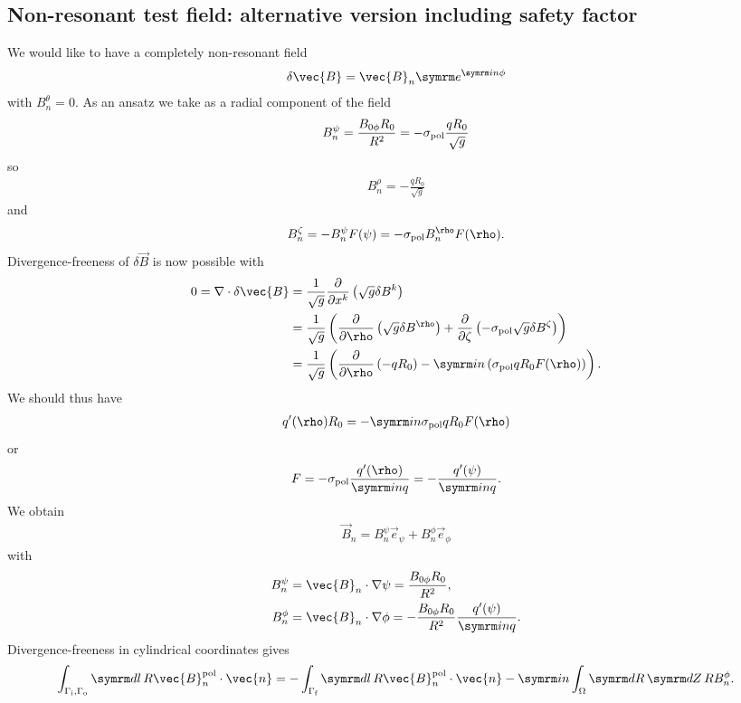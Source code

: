 \subsection{Non-resonant test field: alternative version including safety factor}

We would like to have a completely non-resonant field
\begin{gather*}
  \delta \vec{B} = \vec{B}_{n} \e^{\im n \phi}
\end{gather*}
with $B_{n}^{\theta} = 0$. As an ansatz we take as a radial component of the field
\begin{gather}
  B_{n}^{\psi} = \frac{B_{0 \phi} R_{0}}{R^{2}} = -\sigma_{\pol} \frac{q R_{0}}{\sqrt{g}}
\end{gather}
so
\begin{gather*}
  B_{n}^{\rho} = -\frac{q R_{0}}{\sqrt{g}}
\end{gather*}
and
\begin{gather*}
  B_{n}^{\zeta} = -B_{n}^{\psi} F(\psi) = -\sigma_{\pol} B_{n}^{\rho} F(\rho).
\end{gather*}
Divergence-freeness of $\delta \vec{B}$ is now possible with
\begin{align*}
  0 = \nabla \cdot \delta \vec{B} &= \frac{1}{\sqrt{g}} \pd{x^{k}} \left( \sqrt{g} \delta B^{k} \right) \\
  &= \frac{1}{\sqrt{g}} \left( \pd{\rho} \left( \sqrt{g} \delta B^{\rho} \right) + \pd{\zeta} \left( -\sigma_{\pol} \sqrt{g} \delta B^{\zeta} \right) \right) \\
  &= \frac{1}{\sqrt{g}} \left(\pd{\rho} \left( -q R_{0} \right) - \im n \left( \sigma_{\pol} q R_{0} F(\rho) \right) \right).
\end{align*}
We should thus have 
\begin{gather*}
  q' (\rho) R_{0} = -\im n \sigma_{\pol} q R_{0} F(\rho)
\end{gather*}
or
\begin{gather*}
  F = -\sigma_{\pol} \frac{q' (\rho)}{\im n q} = -\frac{q' (\psi)}{\im n q}.
\end{gather*}
We obtain
\begin{gather*}
  \vec{B}_{n} = B_{n}^{\psi} \vec{e}_{\psi} + B_{n}^{\phi} \vec{e}_{\phi}
\end{gather*}
with
\begin{align*}
  B_{n}^{\psi} &= \vec{B}_{n} \cdot \nabla \psi = \frac{B_{0 \phi} R_{0}}{R^{2}}, \\
  B_{n}^{\phi} &= \vec{B}_{n} \cdot \nabla \phi = -\frac{B_{0 \phi} R_{0}}{R^{2}} \frac{q' (\psi)}{\im n q}.
\end{align*}
Divergence-freeness in cylindrical coordinates gives
\begin{gather*}
  \int_{\Gamma_{\inw}, \Gamma_{\out}} \diff l \, R \vec{B}_{n}^{\pol} \cdot \vec{n} = -\int_{\Gamma_{\fs}} \diff l \, R \vec{B}_{n}^{\pol} \cdot \vec{n} - \im n \int_{\Omega} \diff R \, \diff Z \, R B_{n}^{\phi}.
\end{gather*}
